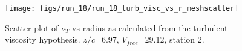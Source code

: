 \begin{figure}[H]
\centering
\texttt{[image: figs/run\_18/run\_18\_turb\_visc\_vs\_r\_meshscatter]}
\caption{Scatter plot of $\nu_T$ vs radius as calculated from the turbulent viscosity hypothesis. $z/c$=6.97, $V_{free}$=29.12, station 2.}
\label{fig:run_18_turb_visc_vs_r_meshscatter}
\end{figure}


